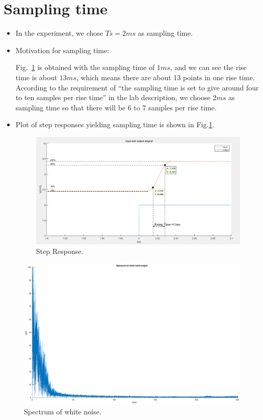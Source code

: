 \documentclass[10pt,a4paper]{article}
\begin{document}
\section{Sampling time}
\begin{itemize}
    \item In the experiment, we chose $Ts = 2ms$ as sampling time.
    \item Motivation for sampling time:
    \par Fig.~\ref{fig:samplingTime} is obtained with the sampling time of $1ms$, and we can see the rise time is about $13ms$, which means there are about 13 points in one rise time. According to the requirement of ``the sampling time is set to give around four to ten samples per rise time'' in the lab description, we choose $2ms$ as sampling time so that there will be 6 to 7 samples per rise time.
    \item Plot of step responses yielding sampling time is shown in Fig.\ref{fig:samplingTime}.
    \begin{figure}[ht]
		\footnotesize
		\centering 
		\includegraphics[width=0.7\columnwidth]{findSamplingTime.png} 
		\caption{Step Response.}
		\label{fig:samplingTime}
	\end{figure}
\end{itemize}
\begin{figure}[ht]
		\footnotesize
		\centering
		\includegraphics[width=0.7\columnwidth]{whiteNoiseSpectrum.eps} 
		\caption{Spectrum of white noise.}
		\label{fig:whiteNoiseSpectrum}
	\end{figure}
\end{document}
